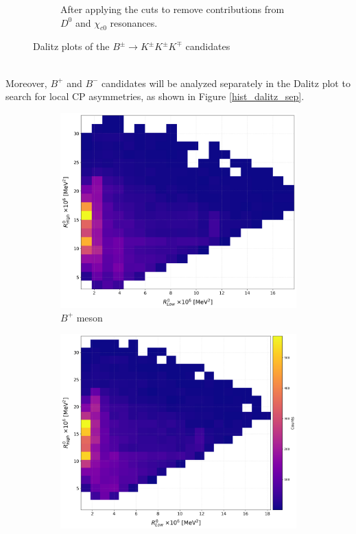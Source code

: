 \begin{figure}[H]
\begin{subfigure}[b]{0.48\textwidth}
           \caption{After applying the cuts to remove contributions from \(D^0\) and \(\chi_{c0}\) resonances.}
        \end{subfigure}
        \caption{Dalitz plots of the \(B^\pm \to K^\pm K^\pm K^\mp\) candidates}
        \label{hist_dalitz_data_cut}
    \end{figure}
    \\

    Moreover, \(B^+\) and \(B^-\) candidates will be analyzed separately in the Dalitz plot to search for local CP asymmetries, as shown in Figure \ref{hist_dalitz_sep}.

    \begin{figure}[H]
        \centering
        \begin{subfigure}[b]{0.48\textwidth}
            \centering
            \includegraphics[width=\textwidth, scale=0.35]{Figure/hist_dalitz_plus.png}
            \caption{\(B^+\) meson}
        \end{subfigure}
        \hfill
        \begin{subfigure}[b]{0.48\textwidth}
            \centering
            \includegraphics[width=\textwidth, scale=0.35]{Figure/hist_dalitz_minus.png}

\end{subfigure}
\end{figure}
